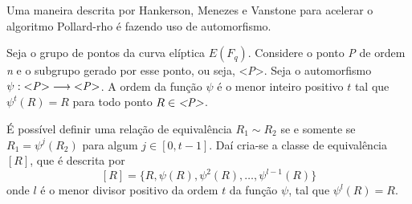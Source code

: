 Uma maneira descrita por Hankerson, Menezes e Vanstone para acelerar o algoritmo Pollard-rho é fazendo uso de automorfismo.\cite{Guide}

Seja o grupo de pontos da curva elíptica $E(F_q)$. Considere o ponto \textit{P} de ordem \textit{n} e o subgrupo gerado por esse ponto, ou seja, <\textit{P}>. Seja o automorfismo $\psi: \mbox{<\textit{P}>}\longrightarrow \mbox{<\textit{P}>}$. A ordem da função $\psi$ é o menor inteiro positivo $t$ tal que $\psi^t(R) = R$ para todo ponto $R \in \mbox{\textit{<P>}}$.

É possível definir uma relação de equivalência $R_1 \sim R_2$ se e somente se $R_1 = \psi^j(R_2)$ para algum $j \in [0, t - 1]$. Daí cria-se a classe de equivalência $[R]$, que é descrita por
$$
[R] = \{R, \psi(R), \psi^2(R), \dots, \psi^{l-1}(R)\}
$$
onde $l$ é o menor divisor positivo da ordem $t$ da função $\psi$, tal que $\psi^l(R) = R$.
